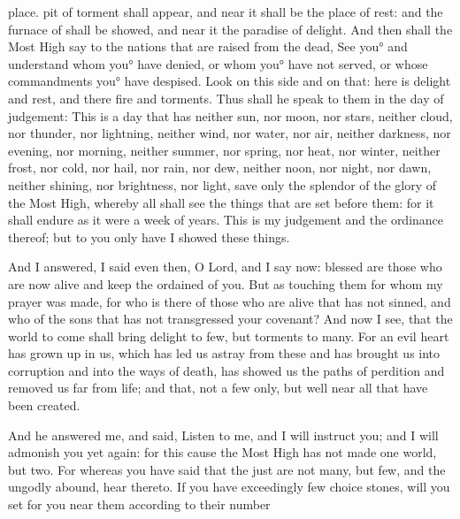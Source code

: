 {{place.
} pit of torment shall appear, and near it shall be the place of rest: and the furnace of
 shall be showed, and near it the paradise of delight.
And then shall the Most High say to the nations that are raised from the dead, See you° and understand whom you° have denied, or whom you° have not served, or whose commandments you° have despised.
Look on this side and on that: here is delight and rest, and there fire and torments. Thus
 shall he speak to them in the day of judgement:
This is a day that has neither sun, nor moon, nor stars,
neither cloud, nor thunder, nor lightning, neither wind, nor water, nor air, neither darkness, nor evening, nor morning,
neither summer, nor spring, nor heat, nor
 winter, neither frost, nor cold, nor hail, nor rain, nor dew,
neither noon, nor night, nor dawn, neither shining, nor brightness, nor light, save only the splendor of the glory of the Most High, whereby all shall see the things that are set before them:
for it shall endure as it were a week of years.
This is my judgement and the ordinance thereof; but to you only have I showed these things.
\par }{\PP {}And I answered, I said even then, O Lord, and I say now: blessed are those who are now alive and keep the
{} ordained of you.
But as touching them for whom my prayer was made,
{} for who is there of those who are alive that has not sinned, and who of the sons
{} that has not transgressed your covenant?
And now I see, that the world to come shall bring delight to few, but torments to many.
For an evil heart has grown up in us, which has led us astray from these
{} and has brought us into corruption and into the ways of death, has showed us the paths of perdition and removed us far from life; and that, not a few only, but well near all that have been created.
\par }{\PP {}And he answered me, and said, Listen to me, and I will instruct you; and I will admonish you yet again:
for this cause the Most High has not made one world, but two.
For whereas you have said that the just are not many, but few, and the ungodly abound, hear
{} thereto.
If you have exceedingly few choice stones,
 will you set for you near them according to their number
}
